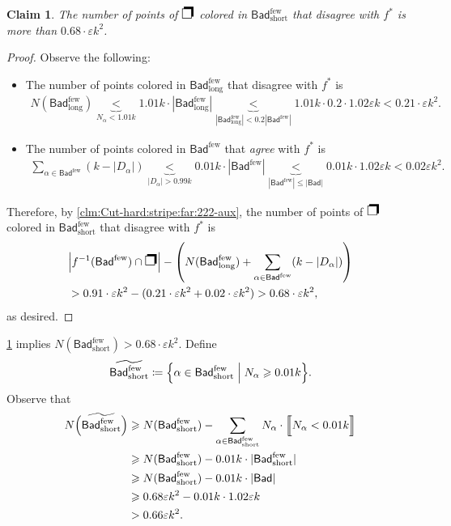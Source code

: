 \documentclass[11pt,fleqn]{article}
\renewcommand{\geq}{\geqslant}
\renewcommand{\leq}{\leqslant}
\renewcommand{\epsilon}{\varepsilon}
\renewcommand{\tilde}{\widetilde}
\newcommand{\defeq}{\coloneq}
\newcommand{\f}{f}
\newcommand{\Bad}{\mathsf{Bad}}
\newcommand{\Badlss}{\Bad^\mathrm{few}}
\newcommand{\BadlssL}{\Badlss_\mathrm{long}}
\newcommand{\BadlssS}{\Badlss_\mathrm{short}}
\newcommand{\SQ}{\text{{\Large\ding{112}}}}
\newtheorem{claim}[theorem]{Claim}
\theoremstyle{definition}
\numberwithin{equation}{section}
\begin{document}
\begin{claim}
\label{clm:Cut-hard:stripe:far:2222-aux}
The number of points of $\SQ$ colored in $\BadlssS$ that disagree with $\f^*$ is
more than $0.68 \cdot \epsilon k^2$.
\end{claim}
\begin{proof}
Observe the following:
\begin{itemize}
\item The number of points colored in $\BadlssL$ that disagree with $\f^*$ is
\begin{align}
    N(\BadlssL)
    \underbrace{<}_{N_\alpha < 1.01k}
        1.01k \cdot |\BadlssL|
    \underbrace{<}_{|\BadlssL| < 0.2 |\Badlss|}
        1.01k \cdot 0.2 \cdot 1.02 \epsilon k
    < 0.21 \cdot \epsilon k^2.
\end{align}

\item The number of points colored in $\Badlss$ that \emph{agree} with $\f^*$ is
\begin{align}
    \sum_{\alpha \in \Badlss} (k-|D_\alpha|)
    \underbrace{<}_{|D_\alpha| > 0.99k}
        0.01k \cdot |\Badlss|
    \underbrace{<}_{|\Badlss| \leq |\Bad|} 0.01k \cdot 1.02 \epsilon k
    < 0.02 \epsilon k^2.
\end{align}
\end{itemize}
Therefore, by \cref{clm:Cut-hard:stripe:far:222-aux},
the number of points of $\SQ$ colored in $\BadlssS$ that disagree with $\f^*$ is
\begin{align}
\begin{aligned}
    & \Bigl| \f^{-1}(\Badlss) \cap \SQ \Bigr| - \left(N(\BadlssL) + \sum_{\alpha \in \Badlss} (k-|D_\alpha|) \right) \\
    & > 0.91 \cdot \epsilon k^2 - (0.21 \cdot \epsilon k^2 + 0.02 \cdot \epsilon k^2)
    > 0.68 \cdot \epsilon k^2,
\end{aligned}
\end{align}
as desired.
\end{proof}


\cref{clm:Cut-hard:stripe:far:2222-aux} implies $N(\BadlssS) > 0.68 \cdot \epsilon k^2$.
Define 
\begin{align}
    \tilde{\BadlssS} \defeq \Bigl\{
        \alpha \in \BadlssS \Bigm| N_\alpha \geq 0.01k
    \Bigr\}.
\end{align}
Observe that
\begin{align}
\begin{aligned}
    N\Bigl(\tilde{\BadlssS}\Bigr)
    & \geq N(\BadlssS) -
        \sum_{\alpha \in \BadlssS} N_\alpha \cdot \Bigl\llbracket N_\alpha < 0.01k \Bigr\rrbracket \\
    & \geq N(\BadlssS) - 0.01k \cdot |\BadlssS| \\
    & \geq N(\BadlssS) - 0.01k \cdot |\Bad| \\
    & \geq 0.68\epsilon k^2 - 0.01k \cdot 1.02\epsilon k \\
    & > 0.66 \epsilon k^2.
\end{aligned}
\end{align}
\end{document}
